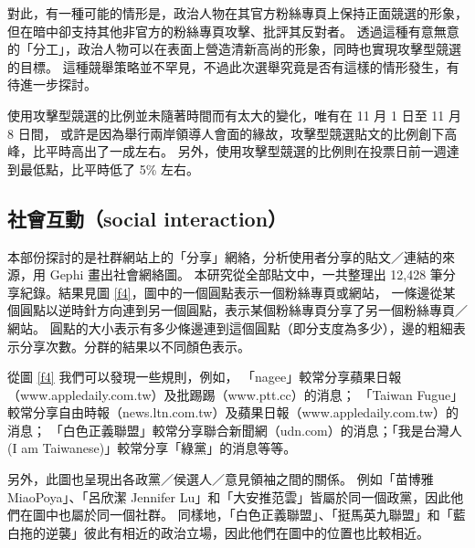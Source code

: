 \documentclass[a4paper, 10pt, conference]{ieeeconf}       %
\begin{document}
\begin{CJK}{UTF8}{bsmi}
對此，有一種可能的情形是，政治人物在其官方粉絲專頁上保持正面競選的形象，但在暗中卻支持其他非官方的粉絲專頁攻擊、批評其反對者。%
透過這種有意無意的「分工」，政治人物可以在表面上營造清新高尚的形象，同時也實現攻擊型競選的目標。%
這種競舉策略並不罕見，不過此次選舉究竟是否有這樣的情形發生，有待進一步探討。%

使用攻擊型競選的比例並未隨著時間而有太大的變化，唯有在 11 月 1 日至 11 月 8 日間，%
或許是因為舉行兩岸領導人會面的緣故，攻擊型競選貼文的比例創下高峰，比平時高出了一成左右。%
另外，使用攻擊型競選的比例則在投票日前一週達到最低點，比平時低了 5\% 左右。%

\subsection*{社會互動（social interaction）}

本部份探討的是社群網站上的「分享」網絡，分析使用者分享的貼文／連結的來源，用 Gephi 畫出社會網絡圖。%
本研究從全部貼文中，一共整理出 12,428 筆分享紀錄。結果見圖 \ref{f4}，圖中的一個圓點表示一個粉絲專頁或網站，%
一條邊從某個圓點以逆時針方向連到另一個圓點，表示某個粉絲專頁分享了另一個粉絲專頁／網站。%
圓點的大小表示有多少條邊連到這個圓點（即分支度為多少），邊的粗細表示分享次數。分群的結果以不同顏色表示。%

從圖 \ref{f4} 我們可以發現一些規則，例如，%
「nagee」較常分享蘋果日報（www.appledaily.com.tw）及批踢踢（www.ptt.cc）的消息；%
「Taiwan Fugue」較常分享自由時報（news.ltn.com.tw）及蘋果日報（www.appledaily.com.tw）的消息；%
「白色正義聯盟」較常分享聯合新聞網（udn.com）的消息；「我是台灣人 (I am Taiwanese)」較常分享「綠黨」的消息等等。%

\addtolength{\textheight}{-1.2cm} %

另外，此圖也呈現出各政黨／侯選人／意見領袖之間的關係。%
例如「苗博雅 MiaoPoya」、「呂欣潔 Jennifer Lu」和「大安推范雲」皆屬於同一個政黨，因此他們在圖中也屬於同一個社群。%
同樣地，「白色正義聯盟」、「挺馬英九聯盟」和「藍白拖的逆襲」彼此有相近的政治立場，因此他們在圖中的位置也比較相近。%


\end{CJK}
\end{document}
